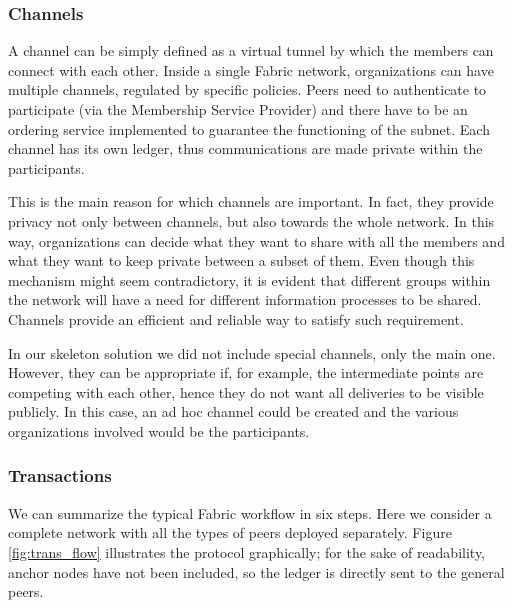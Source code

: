 \subsubsection{Channels}
A channel can be simply defined as a virtual tunnel by which the members can connect with each other. Inside a single Fabric network, organizations can have multiple channels, regulated by specific policies. Peers need to authenticate to participate (via the Membership Service Provider) and there have to be an ordering service implemented to guarantee the functioning of the subnet. Each channel has its own ledger, thus communications are made private within the participants.

This is the main reason for which channels are important. In fact, they provide privacy not only between channels, but also towards the whole network. In this way, organizations can decide what they want to share with all the members and what they want to keep private between a subset of them.
Even though this mechanism might seem contradictory, it is evident that different groups within the network will have a need for different information processes to be shared. Channels provide an efficient and reliable way to satisfy such requirement.

In our skeleton solution we did not include special channels, only the main one. However, they can be appropriate if, for example, the intermediate points are competing with each other, hence they do not want all deliveries to be visible publicly. In this case, an ad hoc channel could be created and the various organizations involved would be the participants.

\subsubsection{Transactions}
We can summarize the typical Fabric workflow in six steps. Here we consider a complete network with all the types of peers deployed separately. Figure \ref{fig:trans_flow} illustrates the protocol graphically; for the sake of readability, anchor nodes have not been included, so the ledger is directly sent to the general peers.

\begin{figure}[htb]
\end{figure}

